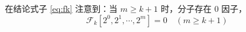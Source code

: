 \documentclass{sjtuarticle}
\begin{document}
\begin{itemize}
\begin{solution}

        在结论式子 \eqref{eq:fk} 注意到：当 $m\geq k+1$ 时，分子存在 0 因子，\begin{equation}
            \mathcal{F}_k[2^0,2^{1},\cdots,2^{m}]=0\quad (m\geq k+1)
        \end{equation}


\end{solution}
\end{itemize}
\end{document}
